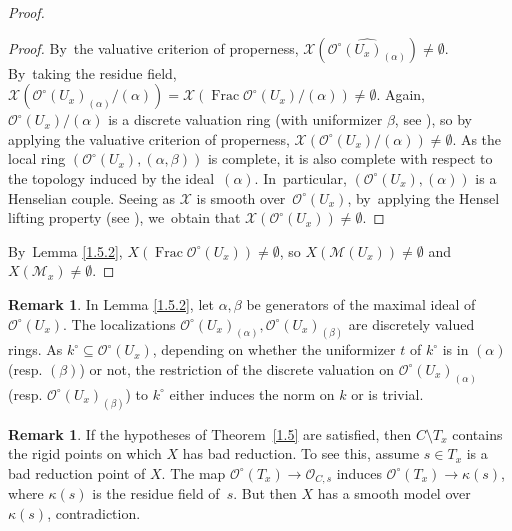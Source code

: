\documentclass[JEP,XML,SOM,Unicode,NoFloatCountersInSection,published]{cedram}
\DeclareMathOperator{\Frac}{Frac}
\let\backslash\setminus
\theoremstyle{definition}
\newtheorem{rem}[thm]{Remark}
\begin{document}
\begin{proof}
\begin{proof}
By~the valuative criterion of properness, $\mathcal{X}(\widehat{\mathcal{O}^{\circ}(U_x)_{(\alpha)}}) \neq \emptyset$. By~taking the residue field, $\mathcal{X}(\mathcal{O}^{\circ}(U_x)_{(\alpha)}/(\alpha))=\mathcal{X}(\Frac \mathcal{O}^{\circ}(U_x)/(\alpha)) \neq \emptyset$.
Again, $\mathcal{O}^{\circ}(U_x)/(\alpha)$ is a discrete valuation ring (with uniformizer $\beta$, see \cite[Tag\,00NQ]{stacks}), so by applying the valuative criterion of properness, $\mathcal{X}(\mathcal{O}^{\circ}(U_x)/(\alpha)) \neq \emptyset$.
As the local ring $(\mathcal{O}^{\circ}(U_x), (\alpha, \beta))$ is complete, it is also complete with respect to the topology induced by the ideal~$(\alpha)$. In~particular, $(\mathcal{O}^{\circ}(U_x), (\alpha))$ is a Henselian couple. Seeing as $\mathcal{X}$ is smooth over~$\mathcal{O}^{\circ}(U_x)$, by~apply\-ing the Hensel lifting property (see \cite[Th.\,I.8]{gruson}), we~obtain that ${\mathcal{X}(\mathcal{O}^{\circ}(U_x)) \neq \emptyset}$.
\end{proof}

By~Lemma \ref{1.5.2}, $X(\Frac \mathcal{O}^{\circ}(U_x)) \neq \emptyset$, so $X(\mathscr{M}(U_x)) \neq \emptyset$ and ${X(\mathscr{M}_x) \neq \emptyset}$.
\end{proof}

\begin{rem} \label{1.6bis}
In Lemma \ref{1.5.2}, let $\alpha, \beta$ be generators of the maximal ideal of $\mathcal{O}^{\circ}(U_x)$. The localizations $\mathcal{O}^{\circ}(U_x)_{(\alpha)}, \mathcal{O}^{\circ}(U_x)_{(\beta)}$ are discretely valued rings. As ${k^{\circ} \subseteq \mathcal{O}^{\circ}(U_x)}$, depending on whether the uniformizer $t$ of $k^{\circ}$ is in $(\alpha)$ (resp. $(\beta)$) or not, the restriction of the discrete valuation on $\mathcal{O}^{\circ}(U_x)_{(\alpha)}$ (resp. $\mathcal{O}^{\circ}(U_x)_{(\beta)}$) to $k^{\circ}$ either induces the norm on $k$ or is trivial.
\end{rem}

\begin{rem} \label{1.6.1}
If the hypotheses of Theorem~\ref{1.5} are satisfied, then $C \backslash T_x$ contains the rigid points on which $X$ has bad reduction. To see this, assume $s \in T_x$ is a bad reduction point of $X$. The map $\mathcal{O}^{\circ}(T_x) \to \mathcal{O}_{C,s}$ induces $\mathcal{O}^{\circ}(T_x) \to \kappa(s)$, where $\kappa(s)$ is the residue field of~$s$. But then $X$ has a smooth model over~$\kappa(s)$, contradiction.
\end{rem}
\end{document}
